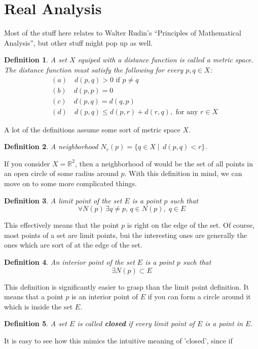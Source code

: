 \documentclass[12pt,a4paper]{report}
\newtheorem{definition}{Definition}
\begin{document}
\section{Real Analysis}
Most of the stuff here relates to Walter Rudin's ``Principles of Mathematical
Analysis'', but other stuff might pop up as well.\\
\begin{definition}
  A set $X$ equiped with a distance function is called a metric space. The
  distance function must satisfy the following for every $p,q\in X$:
  \begin{align*}
    &(a)\quad d(p,q) > 0 \text{ if } p\not = q\\
    &(b)\quad d(p,p) = 0\\
    &(c)\quad d(p,q) = d(q,p)\\
    &(d)\quad d(p,q) \leq d(p,r) + d(r,q),\text{ for any } r\in X
  \end{align*}
\end{definition}
A lot of the definitions assume some sort of metric space $X$.
\begin{definition}
  A neighborhood \(N_r(p) = \{ q\in X\;|\;\, d(p,q)<r \}\).
\end{definition}
If you consider $X=\mathbb{R}^2$, then a neighborhood of would be the set of all
points in an open circle of some radius around $p$. With this definition in
mind, we can move on to some more complicated things.
\begin{definition}
  A limit point of the set $E$ is a point \(p\) such that
  \[
    \forall N(p)\,\exists q \not = p,\,q\in N(p),\;q\in E
  \]
\end{definition}
This effectively means that the point $p$ is right on the edge of the set. Of
course, most points of a set are limit points, bui the interesting ones are
generally the ones which are sort of at the edge of the set.
\begin{definition}
  An interior point of the set $E$ is a point $p$ such that \[\exists N(p)
  \subset E\]
\end{definition}
This definition is significantly easier to grasp than the limit point
definition. It means that a point $p$ is an interior point of $E$ if you can form a
circle around it which is inside the set $E$.
\begin{definition}
  A set $E$ is called \textbf{closed} if every limit point of $E$ is a point in $E$.
\end{definition}
It is easy to see how this mimics the intuitive meaning of 'closed', since if
\end{document}
